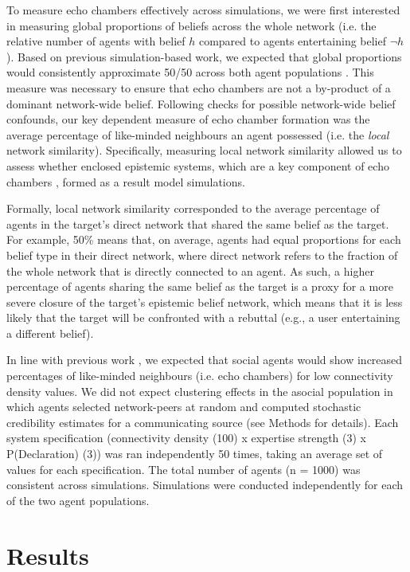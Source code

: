 \documentclass[fleqn,10pt]{wlscirep}
\begin{document}
To measure echo chambers effectively across simulations, we were first interested in measuring global proportions of beliefs across the whole network (i.e. the relative number of agents with belief \(h\) compared to agents entertaining belief \(\neg h\)). Based on previous simulation-based work, we expected that global proportions would consistently approximate 50/50 across both agent populations \cite{pilditch2017opinion}. This measure was necessary to ensure that echo chambers are not a by-product of a dominant network-wide belief. Following checks for possible network-wide belief confounds, our key dependent measure of echo chamber formation was the average percentage of like-minded neighbours an agent possessed (i.e. the \textit{local} network similarity). Specifically, measuring local network similarity allowed us to assess whether enclosed epistemic systems, which are a key component of echo chambers \cite{madsen2018large}, formed as a result model simulations.


Formally, local network similarity corresponded to the average percentage of agents in the target's direct network that shared the same belief as the target. For example, 50\% means that, on average, agents had equal proportions for each belief type in their direct network, where direct network refers to the fraction of the whole network that is directly connected to an agent. As such, a higher percentage of agents sharing the same belief as the target is a proxy for a more severe closure of the target's epistemic belief network, which means that it is less likely that the target will be confronted with a rebuttal (e.g., a user entertaining a different belief).

In line with previous work \cite{pilditch2017opinion}, we expected that social agents would show increased percentages of like-minded neighbours (i.e. echo chambers) for low connectivity density values. We did not expect clustering effects in the asocial population in which agents selected network-peers at random and computed stochastic credibility estimates for a communicating source (see Methods for details). Each system specification (connectivity density (100) x expertise strength (3) x P(Declaration) (3)) was ran independently 50 times, taking an average set of values for each specification. The total number of agents (n = 1000) was consistent across simulations. Simulations were conducted independently for each of the two agent populations.

\section*{Results}
\end{document}

